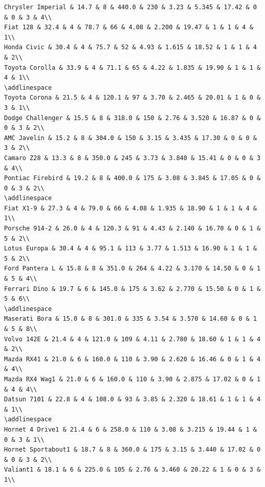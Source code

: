 \documentclass[a4paper, nobind]{templates/ociamthesis}
\begin{document}
\begin{verbatim}
Chrysler Imperial & 14.7 & 8 & 440.0 & 230 & 3.23 & 5.345 & 17.42 & 0 & 0 & 3 & 4\\
Fiat 128 & 32.4 & 4 & 78.7 & 66 & 4.08 & 2.200 & 19.47 & 1 & 1 & 4 & 1\\
Honda Civic & 30.4 & 4 & 75.7 & 52 & 4.93 & 1.615 & 18.52 & 1 & 1 & 4 & 2\\
Toyota Corolla & 33.9 & 4 & 71.1 & 65 & 4.22 & 1.835 & 19.90 & 1 & 1 & 4 & 1\\
\addlinespace
Toyota Corona & 21.5 & 4 & 120.1 & 97 & 3.70 & 2.465 & 20.01 & 1 & 0 & 3 & 1\\
Dodge Challenger & 15.5 & 8 & 318.0 & 150 & 2.76 & 3.520 & 16.87 & 0 & 0 & 3 & 2\\
AMC Javelin & 15.2 & 8 & 304.0 & 150 & 3.15 & 3.435 & 17.30 & 0 & 0 & 3 & 2\\
Camaro Z28 & 13.3 & 8 & 350.0 & 245 & 3.73 & 3.840 & 15.41 & 0 & 0 & 3 & 4\\
Pontiac Firebird & 19.2 & 8 & 400.0 & 175 & 3.08 & 3.845 & 17.05 & 0 & 0 & 3 & 2\\
\addlinespace
Fiat X1-9 & 27.3 & 4 & 79.0 & 66 & 4.08 & 1.935 & 18.90 & 1 & 1 & 4 & 1\\
Porsche 914-2 & 26.0 & 4 & 120.3 & 91 & 4.43 & 2.140 & 16.70 & 0 & 1 & 5 & 2\\
Lotus Europa & 30.4 & 4 & 95.1 & 113 & 3.77 & 1.513 & 16.90 & 1 & 1 & 5 & 2\\
Ford Pantera L & 15.8 & 8 & 351.0 & 264 & 4.22 & 3.170 & 14.50 & 0 & 1 & 5 & 4\\
Ferrari Dino & 19.7 & 6 & 145.0 & 175 & 3.62 & 2.770 & 15.50 & 0 & 1 & 5 & 6\\
\addlinespace
Maserati Bora & 15.0 & 8 & 301.0 & 335 & 3.54 & 3.570 & 14.60 & 0 & 1 & 5 & 8\\
Volvo 142E & 21.4 & 4 & 121.0 & 109 & 4.11 & 2.780 & 18.60 & 1 & 1 & 4 & 2\\
Mazda RX41 & 21.0 & 6 & 160.0 & 110 & 3.90 & 2.620 & 16.46 & 0 & 1 & 4 & 4\\
Mazda RX4 Wag1 & 21.0 & 6 & 160.0 & 110 & 3.90 & 2.875 & 17.02 & 0 & 1 & 4 & 4\\
Datsun 7101 & 22.8 & 4 & 108.0 & 93 & 3.85 & 2.320 & 18.61 & 1 & 1 & 4 & 1\\
\addlinespace
Hornet 4 Drive1 & 21.4 & 6 & 258.0 & 110 & 3.08 & 3.215 & 19.44 & 1 & 0 & 3 & 1\\
Hornet Sportabout1 & 18.7 & 8 & 360.0 & 175 & 3.15 & 3.440 & 17.02 & 0 & 0 & 3 & 2\\
Valiant1 & 18.1 & 6 & 225.0 & 105 & 2.76 & 3.460 & 20.22 & 1 & 0 & 3 & 1\\

\end{verbatim}
\end{document}
